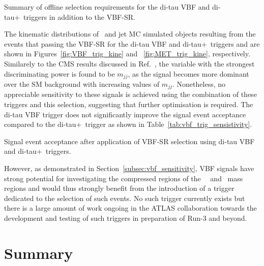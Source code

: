 	\begin{table}[!hbt]
	\centering
	\caption{Summary of offline selection requirements for the di-tau \ac{VBF} and di-tau+\met\ triggers in addition to the \ac{VBF}-\ac{SR}.}
	
	\label{tab:vbf_trig_selection}
	\end{table}
	
	The kinematic distributions of \ltau\ and jet \ac{MC} simulated objects resulting from the events that passing the \ac{VBF}-\ac{SR} for the di-tau \ac{VBF} and di-tau+\met\ triggers and  are shown in Figures~\ref{fig:VBF_trig_kine} and ~\ref{fig:MET_trig_kine}, respectively. 
	Similarely to the \ac{CMS} results discussed in Ref.~\cite{CMSVBFpaper}, the variable with the strongest discriminating power is found to be $m_{jj}$, as the signal becomes more dominant over the \ac{SM} background with increasing values of $m_{jj}$.
	 Nonetheless, no appreciable sensitivity to these signals is achieved using the combination of these triggers and this selection, suggesting that further optimisation is required. 
	The di-tau \ac{VBF} trigger does not significantly improve the signal event acceptance compared to the di-tau+\met\ trigger as shown in Table~\ref{tab:vbf_trig_sensistivity}. 
	\begin{table}[!hbt]
	\centering
	\caption{Signal event acceptance after application of \ac{VBF}-\ac{SR} selection using di-tau \ac{VBF} and di-tau+\met\ triggers.}
	
	\label{tab:vbf_trig_sensistivity}
	\end{table}
	However, as demonstrated in Section~\ref{subsec:vbf_sensitivity}, \ac{VBF} signals have strong potential for investigating the compressed regions of the \chinoonepm\, \ninoone\ and \stau\ mass regions and would thus strongly benefit from the introduction of a trigger dedicated to the selection of such events. No such trigger currently exists but there is a large amount of work ongoing in the \ac{ATLAS} collaboration towards the development and testing of such triggers in preparation of Run-3 and beyond.  
	 
	\section{Summary}
	\label{sec:summary}
	
%
%


			
